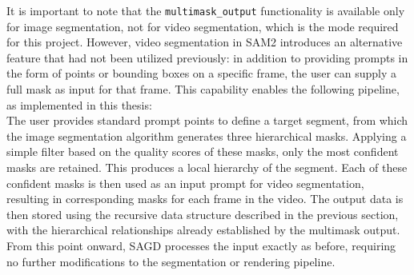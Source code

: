 \documentclass[12pt]{article}
\begin{document}
\FloatBarrier
\noindent
It is important to note that the \texttt{multimask\_output} functionality is available only for image segmentation, not for video segmentation, which is the mode required for this project. However, video segmentation in SAM2 introduces an alternative feature that had not been utilized previously: in addition to providing prompts in the form of points or bounding boxes on a specific frame, the user can supply a full mask as input for that frame. This capability enables the following pipeline, as implemented in this thesis:
\\
The user provides standard prompt points to define a target segment, from which the image segmentation algorithm generates three hierarchical masks. Applying a simple filter based on the quality scores of these masks, only the most confident masks are retained. This produces a local hierarchy of the segment. Each of these confident masks is then used as an input prompt for video segmentation, resulting in corresponding masks for each frame in the video. The output data is then stored using the recursive data structure described in the previous section, with the hierarchical relationships already established by the multimask output. From this point onward, SAGD processes the input exactly as before, requiring no further modifications to the segmentation or rendering pipeline.






\FloatBarrier{}
\noindent\printbibliography
\end{document}
